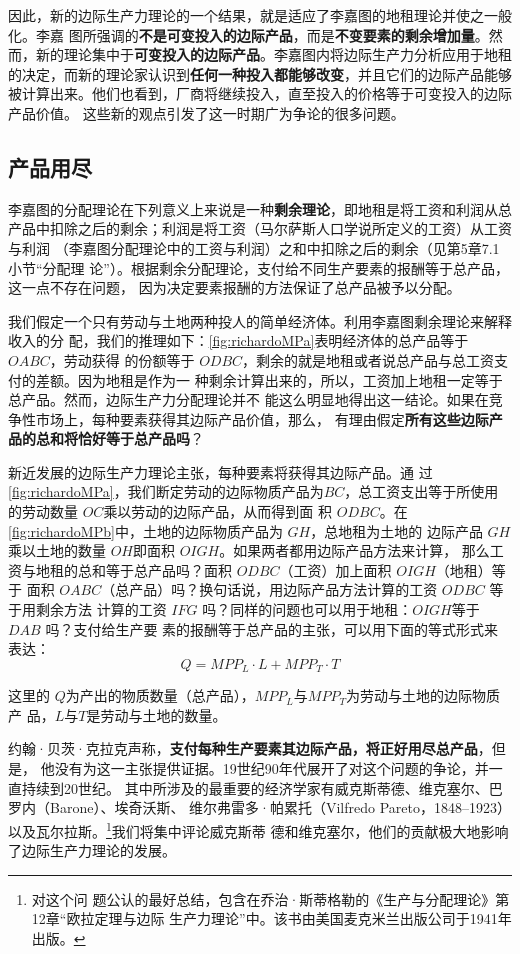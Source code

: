 因此，新的边际生产力理论的一个结果，就是适应了李嘉图的地租理论并使之一般化。李嘉
图所强调的\textbf{不是可变投入的边际产品}，而是\textbf{不变要素的剩余增加量}。然
而，新的理论集中于\textbf{可变投入的边际产品}。李嘉图内将边际生产力分析应用于地租
的决定，而新的理论家认识到\textbf{任何一种投入都能够改变}，并且它们的边际产品能够
被计算出来。他们也看到，厂商将继续投入，直至投入的价格等于可变投入的边际产品价值。
这些新的观点引发了这一时期广为争论的很多问题。

\subsection{产品用尽}

李嘉图的分配理论在下列意义上来说是一种\textbf{剩余理论}，即地租是将工资和利润从总
产品中扣除之后的剩余；利润是将工资（马尔萨斯人口学说所定义的工资）从工资与利润
（李嘉图分配理论中的工资与利润）之和中扣除之后的剩余（见第5章7.1小节“分配理
论”）。根据剩余分配理论，支付给不同生产要素的报酬等于总产品，这一点不存在问题，
因为决定要素报酬的方法保证了总产品被予以分配。

我们假定一个只有劳动与土地两种投人的简单经济体。利用李嘉图剩余理论来解释收入的分
配，我们的推理如下：\cref{fig:richardoMPa}表明经济体的总产品等于 $OABC$，劳动获得
的份额等于 $ODBC$，剩余的就是地租或者说总产品与总工资支付的差额。因为地租是作为一
种剩余计算出来的，所以，工资加上地租一定等于总产品。然而，边际生产力分配理论并不
能这么明显地得出这一结论。如果在竞争性市场上，每种要素获得其边际产品价值，那么，
有理由假定\textbf{所有这些边际产品的总和将恰好等于总产品吗}？

新近发展的边际生产力理论主张，每种要素将获得其边际产品。通
过\cref{fig:richardoMPa}，我们断定劳动的边际物质产品为$BC$，总工资支出等于所使用
的劳动数量 $OC$乘以劳动的边际产品，从而得到面
积 $ODBC$。在\cref{fig:richardoMPb}中，土地的边际物质产品为 $GH$，总地租为土地的
边际产品 $GH$ 乘以土地的数量 $OH$即面积 $OIGH$。如果两者都用边际产品方法来计算，
那么工资与地租的总和等于总产品吗？面积 $ODBC$（工资）加上面积 $OIGH$（地租）等于
面积 $OABC$（总产品）吗？换句话说，用边际产品方法计算的工资 $ODBC$ 等于用剩余方法
计算的工资 $IFG$ 吗？同样的问题也可以用于地租：$OIGH$等于 $DAB$ 吗？支付给生产要
素的报酬等于总产品的主张，可以用下面的等式形式来表达：
\[Q=MPP_L·L + MPP_T · T\]

这里的 $Q$为产出的物质数量（总产品），$MPP_L与MPP_T$为劳动与土地的边际物质产
品，$L与T$是劳动与土地的数量。

约翰·贝茨·克拉克声称，\textbf{支付每种生产要素其边际产品，将正好用尽总产品}，但是，
他没有为这一主张提供证据。19世纪90年代展开了对这个问题的争论，并一直持续到20世纪。
其中所涉及的最重要的经济学家有威克斯蒂德、维克塞尔、巴罗内（Barone）、埃奇沃斯、
维尔弗雷多·帕累托（Vilfredo Pareto，1848--1923）以及瓦尔拉斯。\footnote{对这个问
  题公认的最好总结，包含在乔治·斯蒂格勒的《生产与分配理论》第12章“欧拉定理与边际
  生产力理论”中。该书由美国麦克米兰出版公司于1941年出版。}我们将集中评论威克斯蒂
德和维克塞尔，他们的贡献极大地影响了边际生产力理论的发展。

